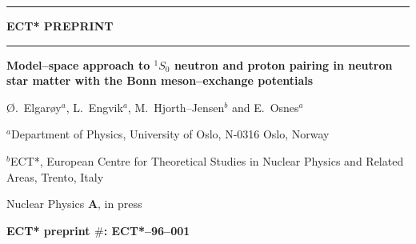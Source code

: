 


\thispagestyle{empty}
\newcommand{\HRule}{\rule{\linewidth}{1mm}}
\setlength{\parindent}{0mm}
\setlength{\parskip}{0mm}


   \HRule
     \begin{center}
         \Huge {\bf ECT* PREPRINT}
     \end{center}
   \HRule
   \begin{center}
      \Large {\bf Model--space approach to $^{1}S_{0}$ 
       neutron and proton pairing 
       in neutron star matter with the Bonn meson--exchange potentials}
   \end{center}
   \begin{center}
      \large \O.\ Elgar\o y$^a$, L.\ Engvik$^a$, M.\ Hjorth--Jensen$^b$
       and E.\ Osnes$^a$
    \end{center}
    \begin{center}
     \large $^a$Department of Physics, University of Oslo, N-0316 Oslo,
     Norway
    \end{center}
    \begin{center}
      \large   $^b$ECT*, European Centre for Theoretical
        Studies in Nuclear Physics and Related Areas,
        Trento, Italy
    \end{center}
    \begin{center}
      \large   Nuclear Physics {\bf A}, in press
    \end{center}
    \begin{center}
        \Large {\bf ECT* preprint $\#$: ECT*--96--001}
    \end{center}
    \begin{figure}[hbtp]
        \begin{center}
        {\centering\mbox{}}
        \end{center}
     \end{figure}
